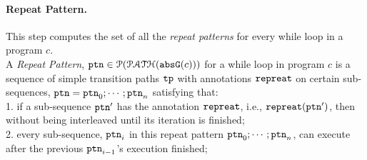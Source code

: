 \paragraph{Repeat Pattern.}
This step computes the set of all the \emph{repeat patterns} for every while loop in a program $c$.
\\
  A \emph{Repeat Pattern},
  $\mathtt{ptn} \in \mathcal{P}(\mathcal{PATH}({\mathtt{abs}{\mathtt{G}}(c)}))$ for a while loop in program $c$ is
a sequence of simple transition paths $\mathtt{tp}$ with annotations $\mathtt{repreat}$ on certain sub-sequences,
$\mathtt{ptn} = \mathtt{ptn}_0; \cdots; \mathtt{ptn}_n$
satisfying that:
\\
1. if a sub-sequence $\mathtt{ptn}'$ has the annotation $\mathtt{repreat}$, i.e., $\mathtt{repreat}(\mathtt{ptn}')$,
then  without being interleaved until its iteration is finished;
\\
2. every sub-sequence, $\mathtt{ptn}_i$ in this repeat pattern $\mathtt{ptn}_0; \cdots; \mathtt{ptn}_n$,
can execute
after the previous $\mathtt{ptn}_{i - 1}$'s execution finished;
